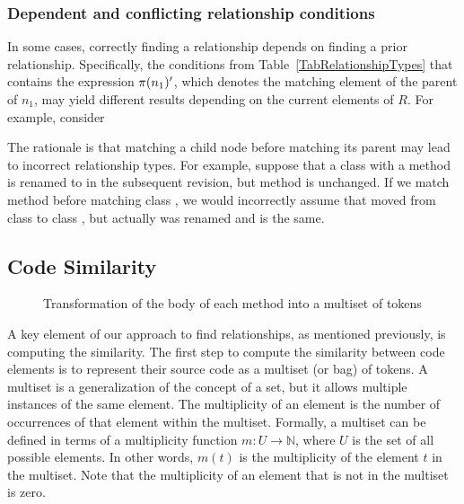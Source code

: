 \subsubsection{Dependent and conflicting relationship conditions}
\label{SecDependentConflictingRel}

In some cases, correctly finding a relationship depends on finding a prior relationship.
Specifically, the conditions from Table~\ref{TabRelationshipTypes} that contains the expression $\operatorname{\pi}(n_1)'$, which denotes the matching element of the parent of $n_1$, may yield different results depending on the current elements of $R$.
For example, consider 



The rationale is that matching a child node before matching its parent may lead to incorrect relationship types. For example, suppose that a class  with a method  is renamed to  in the subsequent revision, but method  is unchanged. If we match method  before matching class , we would incorrectly assume that  moved from class  to class , but actually  was renamed and  is the same.



\subsection{Code Similarity}
\label{SecCodeSim}

\begin{figure}[htb]
\renewcommand{\arraystretch}{1.3}
\centering
\footnotesize

\caption{Transformation of the body of each method into a multiset of tokens}
\label{FigSourceCodeTransformation}
\end{figure}

A key element of our approach to find relationships, as mentioned previously, is computing the similarity.
The first step to compute the similarity between code elements is to represent their source code as a multiset (or bag) of tokens.
A multiset is a generalization of the concept of a set, but it allows multiple instances of the same element.
The multiplicity of an element is the number of occurrences of that element within the multiset. Formally, a multiset can be defined in terms of a multiplicity function $m: U \to \mathbb{N}$, where $U$ is the set of all possible elements. In other words, $m(t)$ is the multiplicity of the element $t$ in the multiset. Note that the multiplicity of an element that is not in the multiset is zero.


